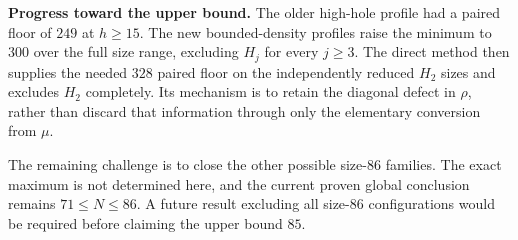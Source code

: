 \documentclass[11pt,a4paper]{article}
\begin{document}
\textbf{Progress toward the upper bound.} The older high-hole profile had a paired floor of $249$ at $h\ge15$. The new bounded-density profiles raise the minimum to $300$ over the full size range, excluding $H_j$ for every $j\ge3$. The direct method then supplies the needed $328$ paired floor on the independently reduced $H_2$ sizes and excludes $H_2$ completely. Its mechanism is to retain the diagonal defect in $\rho$, rather than discard that information through only the elementary conversion from $\mu$.

The remaining challenge is to close the other possible size-$86$ families. The exact maximum is not determined here, and the current proven global conclusion remains $71\le N\le86$. A future result excluding all size-$86$ configurations would be required before claiming the upper bound $85$.
\end{document}
